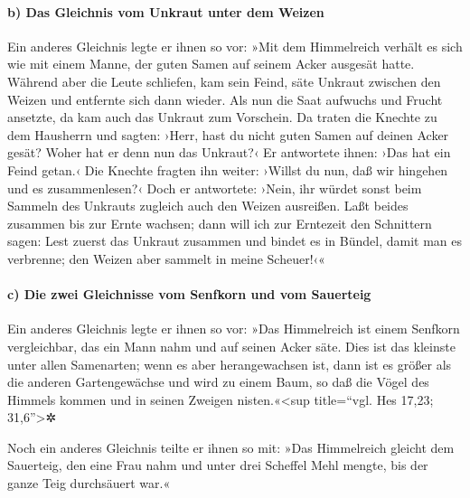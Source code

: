 \hypertarget{b-das-gleichnis-vom-unkraut-unter-dem-weizen}{%
\paragraph{b) Das Gleichnis vom Unkraut unter dem
Weizen}\label{b-das-gleichnis-vom-unkraut-unter-dem-weizen}}

 Ein anderes Gleichnis legte er ihnen so vor: »Mit dem
Himmelreich verhält es sich wie mit einem Manne, der guten Samen auf
seinem Acker ausgesät hatte.  Während aber die Leute
schliefen, kam sein Feind, säte Unkraut zwischen den Weizen und
entfernte sich dann wieder.  Als nun die Saat aufwuchs
und Frucht ansetzte, da kam auch das Unkraut zum Vorschein.
 Da traten die Knechte zu dem Hausherrn und sagten:
›Herr, hast du nicht guten Samen auf deinen Acker gesät? Woher hat er
denn nun das Unkraut?‹  Er antwortete ihnen: ›Das hat ein
Feind getan.‹ Die Knechte fragten ihn weiter: ›Willst du nun, daß wir
hingehen und es zusammenlesen?‹  Doch er antwortete:
›Nein, ihr würdet sonst beim Sammeln des Unkrauts zugleich auch den
Weizen ausreißen.  Laßt beides zusammen bis zur Ernte
wachsen; dann will ich zur Erntezeit den Schnittern sagen: Lest zuerst
das Unkraut zusammen und bindet es in Bündel, damit man es verbrenne;
den Weizen aber sammelt in meine Scheuer!‹«

\hypertarget{c-die-zwei-gleichnisse-vom-senfkorn-und-vom-sauerteig}{%
\paragraph{c) Die zwei Gleichnisse vom Senfkorn und vom
Sauerteig}\label{c-die-zwei-gleichnisse-vom-senfkorn-und-vom-sauerteig}}

 Ein anderes Gleichnis legte er ihnen so vor: »Das
Himmelreich ist einem Senfkorn vergleichbar, das ein Mann nahm und auf
seinen Acker säte.  Dies ist das kleinste unter allen
Samenarten; wenn es aber herangewachsen ist, dann ist es größer als die
anderen Gartengewächse und wird zu einem Baum, so daß die Vögel des
Himmels kommen und in seinen Zweigen nisten.«\textless sup title=``vgl.
Hes 17,23; 31,6''\textgreater✲

 Noch ein anderes Gleichnis teilte er ihnen so mit: »Das
Himmelreich gleicht dem Sauerteig, den eine Frau nahm und unter drei
Scheffel Mehl mengte, bis der ganze Teig durchsäuert war.«

